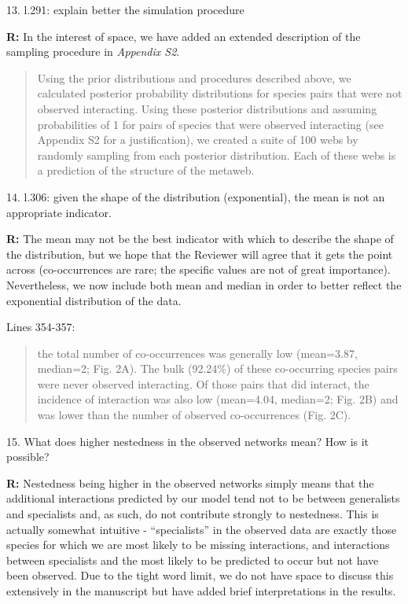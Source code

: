 \documentclass[12pt]{letter}
\begin{document}
	13. l.291: explain better the simulation procedure
	

		\textbf{R:} In the interest of space, we have added an extended description of the sampling procedure in \emph{Appendix S2}. 


		\begin{quotation}
			Using the prior distributions and procedures described above, we calculated posterior probability distributions for species pairs that were not observed interacting. Using these posterior distributions and assuming probabilities of 1 for pairs of species that were observed interacting (see Appendix S2 for a justification), we created a suite of 100 webs by randomly sampling from each posterior distribution. Each of these webs is a prediction of the structure of the metaweb.
		\end{quotation}


	14. l.306: given the shape of the distribution (exponential), the mean is not an appropriate indicator. 


		\textbf{R:} The mean may not be the best indicator with which to describe the shape of the distribution, but we hope that the Reviewer will agree that it gets the point across (co-occurrences are rare; the specific values are not of great importance). Nevertheless, we now include both mean and median in order to better reflect the exponential distribution of the data.


		Lines 354-357:


		\begin{quotation}
			the total number of co-occurrences was generally low (mean=3.87, median=2; Fig. 2A). The bulk (92.24\%) of these co-occurring species pairs were never observed interacting. Of those pairs that did interact, the incidence of interaction was also low (mean=4.04, median=2; Fig. 2B) and was lower than the number of observed co-occurrences (Fig. 2C).
		\end{quotation}


	15. What does higher nestedness in the observed networks mean? How is it possible? 


		\textbf{R:} Nestedness being higher in the observed networks simply means that the additional interactions predicted by our model tend not to be between generalists and specialists and, as such, do not contribute strongly to nestedness. This is actually somewhat intuitive - ``specialists'' in the observed data are exactly those species for which we are most likely to be missing interactions, and interactions between specialists and the most likely to be predicted to occur but not have been observed. Due to the tight word limit, we do not have space to discuss this extensively in the manuscript but have added brief interpretations in the results.
\end{document}
